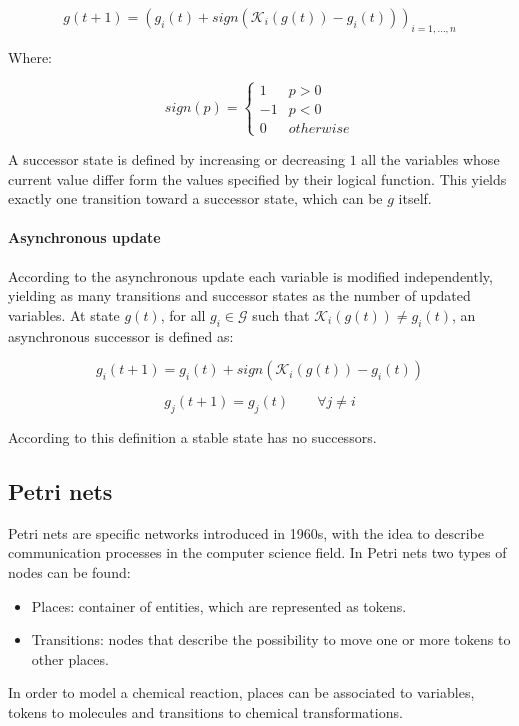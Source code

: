     $$g(t+1) = (g_i(t) + sign(\mathcal{K}_i(g(t))-g_i(t)))_{i=1, \dots, n}$$

    Where:


    $$sign(p) = \begin{cases} 1 & p>0\\ -1 & p<0\\ 0 & otherwise\end{cases}$$

    A successor state is defined by increasing or decreasing $1$ all the variables whose current value differ form the values specified by their logical function.
    This yields exactly one transition toward a successor state, which can be $g$ itself.

    \paragraph{Asynchronous update}
    According to the asynchronous update each variable is modified independently, yielding as many transitions and successor states as the number of updated variables.
    At state $g(t)$, for all $g_i\in\mathcal{G}$ such that $\mathcal{K}_i(g(t))\neq g_i(t)$, an asynchronous successor is defined as:

    $$g_i(t+1) = g_i(t) + sign(\mathcal{K}_i(g(t))-g_i(t))$$

    $$g_j(t+1) = g_j(t)\qquad\forall j\neq i$$

    According to this definition a stable state has no successors.

  \subsection{Petri nets}
  Petri nets are specific networks introduced in 1960s, with the idea to describe communication processes in the computer science field.
  In Petri nets two types of nodes can be found:

  \begin{multicols}{2}
  \begin{itemize}
    \item Places: container of entities, which are represented as tokens.
    \item Transitions: nodes that describe the possibility to move one or more tokens to other places.
  \end{itemize}
\end{multicols}

  In order to model a chemical reaction, places can be associated to variables, tokens to molecules and transitions to chemical transformations.
  \\

